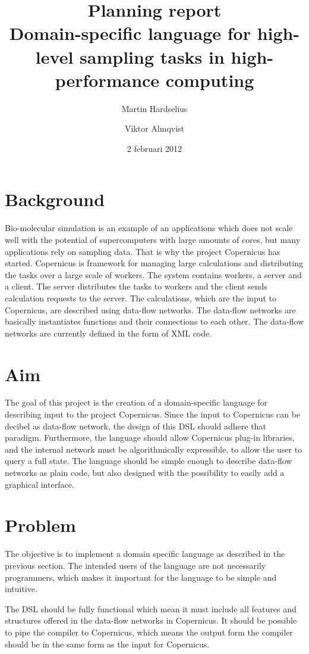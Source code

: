 \documentclass[a4paper]{article}
\title{Planning report\\
  \large{Domain-specific language for high-level
  sampling tasks in high-performance computing
  }
}
\author{Martin Hardselius \and Viktor Almqvist}
\date{2 februari 2012}
\begin{document}
\maketitle
\newpage

\section{Background}

Bio-molecular simulation is an example of an applications which does
not scale well with the potential of supercomputers with large amounts
of cores, but many applications rely on sampling data. That is why the
project Copernicus has started. Copernicus is framework for managing
large calculations and distributing the tasks over a large scale of
workers. The system contains workers, a server and a client. The
server distributes the tasks to workers and the client sends
calculation requests to the server. The calculations, which are the
input to Copernicus, are described using data-flow networks. The
data-flow networks are basically instantiates functions and their
connections to each other. The data-flow networks are currently defined
in the form of XML code.


\section{Aim}
The goal of this project is the creation of a domain-specific language
for describing input to the project Copernicus. Since the input to
Copernicus can be decibel as data-flow network, the design of this
DSL should adhere that paradigm. Furthermore, the language should
allow Copernicus plug-in libraries, and the internal network must be
algorithmically expressible, to allow the user to query a full
state. The language should be simple enough to describe data-flow
networks as plain code, but also designed with the possibility to
easily add a graphical interface.

\section{Problem}
The objective is to implement a domain specific language as described
in the previous section. The intended users of the language are not
necessarily programmers, which makes it important for the language to be
simple and intuitive.

The DSL should be fully functional which mean it must include all
features and structures offered in the data-flow networks in
Copernicus. It should be possible to pipe the compiler to Copernicus,
which means the output form the compiler should be in the same form as
the input for Copernicus.
\end{document}
